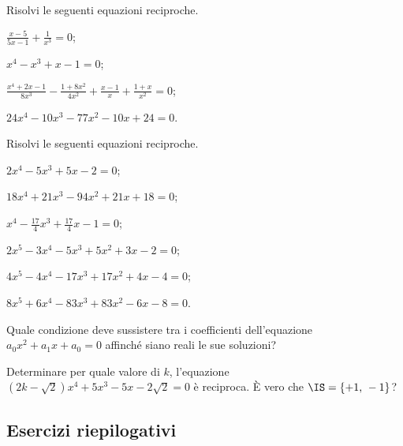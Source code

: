 \begin{esercizio}[\Ast]
 \label{ese:5.48}
Risolvi le seguenti equazioni reciproche.
\begin{multicols}{2}
\begin{enumeratea}
\item $\frac{x-5}{5x-1}+\frac 1{x^3}=0$;
\item $x^4-x^3+x-1=0$;
\item $\frac{x^4+2x-1}{8x^3}-\frac{1+8x^2}{4x^2}+\frac{x-1} x+\frac{1+x}{x^2}=0$;
\item $24x^4-10x^3-77x^{2}-10x+24=0$.
\end{enumeratea}
\end{multicols}
\end{esercizio}

\begin{esercizio}[\Ast]
\label{ese:5.49}
Risolvi le seguenti equazioni reciproche.
\begin{multicols}{2}
\begin{enumeratea}
\item $2x^{4}-5x^{3}+5x-2=0$;
\item $18x^{4}+21x^{3}-94x^{2}+21x+18=0$;
\item $x^{4}-\frac{17}{4}x^{3}+\frac{17}{4}x-1=0$;
\item $2x^{5}-3x^{4}-5x^{3}+5x^{2}+3x-2=0$;
\item $4x^{5}-4x^{4}-17x^{3}+17x^{2}+4x-4=0$;
\item $8x^{5}+6x^{4}-83x^{3}+83x^{2}-6x-8=0$.
\end{enumeratea}
\end{multicols}
\end{esercizio}

\begin{esercizio}
 \label{ese:5.50}
Quale condizione deve sussistere tra i coefficienti dell'equazione $a_0x^2+a_1x+a_0=0$ affinché siano reali le sue soluzioni?
\end{esercizio}

\begin{esercizio}[\Ast]
 \label{ese:5.51}
Determinare per quale valore di $k$, l'equazione $\left(2k-\sqrt 2\right)x^4+5x^3-5x-2\sqrt 2=0$ è reciproca. È vero che $\IS=\{+1\text{, }-1\}$?
\end{esercizio}

\subsection{Esercizi riepilogativi}


